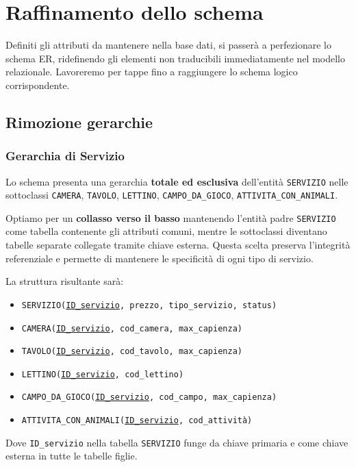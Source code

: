 \documentclass[a4paper,12pt]{report}
\begin{document}
\newpage
\section{Raffinamento dello schema}
Definiti gli attributi da mantenere nella base dati, si passerà a perfezionare lo schema ER, ridefinendo gli elementi non
traducibili immediatamente nel modello relazionale. Lavoreremo per tappe fino a raggiungere lo schema logico corrispondente.

\subsection{Rimozione gerarchie}

\subsubsection*{Gerarchia di Servizio}
Lo schema presenta una gerarchia \textbf{totale ed esclusiva} dell'entità \texttt{SERVIZIO} nelle sottoclassi
\texttt{CAMERA}, \texttt{TAVOLO}, \texttt{LETTINO}, \texttt{CAMPO\_DA\_GIOCO}, \texttt{ATTIVITA\_CON\_ANIMALI}.

Optiamo per un \textbf{collasso verso il basso} mantenendo l'entità padre \texttt{SERVIZIO} come tabella contenente gli
attributi comuni, mentre le sottoclassi diventano tabelle separate collegate tramite chiave esterna. Questa scelta preserva
l'integrità referenziale e permette di mantenere le specificità di ogni tipo di servizio.

\vspace{\baselineskip}
\noindent La struttura risultante sarà:
\begin{itemize}
	\item \texttt{SERVIZIO(\underline{ID\_servizio}, prezzo, tipo\_servizio, status)}
	\item \texttt{CAMERA(\underline{ID\_servizio}, cod\_camera, max\_capienza)}
	\item \texttt{TAVOLO(\underline{ID\_servizio}, cod\_tavolo, max\_capienza)}
	\item \texttt{LETTINO(\underline{ID\_servizio}, cod\_lettino)}
	\item \texttt{CAMPO\_DA\_GIOCO(\underline{ID\_servizio}, cod\_campo, max\_capienza)}
	\item \texttt{ATTIVITA\_CON\_ANIMALI(\underline{ID\_servizio}, cod\_attività)}
\end{itemize}

Dove \texttt{ID\_servizio} nella tabella \texttt{SERVIZIO} funge da chiave primaria e come chiave esterna in tutte le
tabelle figlie.
\end{document}
